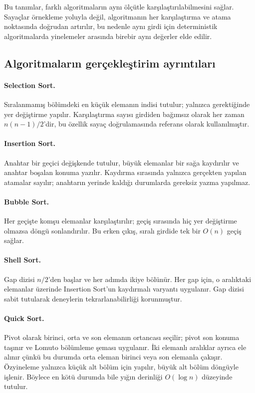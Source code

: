 \documentclass[12pt,a4paper]{article}
\begin{document}
Bu tanımlar, farklı algoritmaların aynı ölçütle karşılaştırılabilmesini sağlar.
Sayaçlar örnekleme yoluyla değil, algoritmanın her karşılaştırma ve atama
noktasında doğrudan artırılır, bu nedenle aynı girdi için deterministik
algoritmalarda yinelemeler arasında birebir aynı değerler elde edilir.

\subsection{Algoritmaların gerçekleştirim ayrıntıları}

\paragraph{Selection Sort.} Sıralanmamış bölümdeki en küçük elemanın indisi
tutulur; yalnızca gerektiğinde yer değiştirme yapılır. Karşılaştırma sayısı
girdiden bağımsız olarak her zaman $n(n-1)/2$'dir, bu özellik sayaç
doğrulamasında referans olarak kullanılmıştır.

\paragraph{Insertion Sort.} Anahtar bir geçici değişkende tutulur, büyük
elemanlar bir sağa kaydırılır ve anahtar boşalan konuma yazılır. Kaydırma
sırasında yalnızca gerçekten yapılan atamalar sayılır; anahtarın yerinde kaldığı
durumlarda gereksiz yazma yapılmaz.

\paragraph{Bubble Sort.} Her geçişte komşu elemanlar karşılaştırılır; geçiş
sırasında hiç yer değiştirme olmazsa döngü sonlandırılır. Bu erken çıkış, sıralı
girdide tek bir $O(n)$ geçiş sağlar.

\paragraph{Shell Sort.} Gap dizisi $n/2$'den başlar ve her adımda ikiye bölünür.
Her gap için, o aralıktaki elemanlar üzerinde Insertion Sort'un kaydırmalı
varyantı uygulanır. Gap dizisi sabit tutularak deneylerin tekrarlanabilirliği
korunmuştur.

\paragraph{Quick Sort.} Pivot olarak birinci, orta ve son elemanın ortancası
seçilir; pivot son konuma taşınır ve Lomuto bölümleme şeması uygulanır. İki
elemanlı aralıklar ayrıca ele alınır çünkü bu durumda orta eleman birinci veya
son elemanla çakışır. Özyineleme yalnızca küçük alt bölüm için yapılır, büyük alt
bölüm döngüyle işlenir. Böylece en kötü durumda bile yığın derinliği $O(\log n)$
düzeyinde tutulur.
\end{document}
